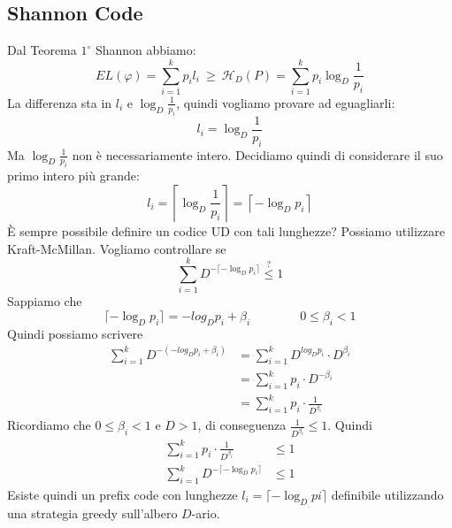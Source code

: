 \subsection{Shannon Code}
Dal Teorema $1^\circ$ Shannon abbiamo:
$$
EL(\varphi) = \sum_{i=1}^k p_il_i ~ \geq ~ \mathcal{H}_D(P) = \sum_{i=1}^k p_i\log_D\frac{1}{p_i}
$$
La differenza sta in $l_i$ e $\log_D\frac{1}{p_i}$, quindi vogliamo provare ad eguagliarli:
$$
    l_i = \log_D\frac{1}{p_i}
$$
Ma $\log_D\frac{1}{p_i}$ non è necessariamente intero. Decidiamo quindi di considerare il suo primo intero più grande:
$$
l_i = \left\lceil\log_D\frac{1}{p_i}\right\rceil = \left\lceil-\log_Dp_i\right\rceil
$$
È sempre possibile definire un codice UD con tali lunghezze? Possiamo utilizzare Kraft-McMillan. Vogliamo controllare se
$$
    \sum_{i=1}^k D^{-\lceil-\log_Dp_i\rceil}
    \stackrel{?}{\leq}
    1
$$
Sappiamo che 
$$
    \lceil-\log_Dp_i\rceil = -log_Dp_i+\beta_i \qquad\qquad 0\leq\beta_i<1
$$
Quindi possiamo scrivere
\begin{align*}
    \sum_{i=1}^k D^{-(-log_Dp_i+\beta_i)} &= \sum_{i=1}^k D^{log_Dp_i}\cdot D^{\beta_i}\\
    &= \sum_{i=1}^k p_i\cdot D^{-\beta_i}\\
    &= \sum_{i=1}^k p_i\cdot \frac{1}{D^{\beta_i}}
\end{align*}
Ricordiamo che $0\leq\beta_i<1$ e $D>1$, di conseguenza $\frac{1}{D^{\beta_i}}\leq 1$. Quindi
\begin{align*}
    \sum_{i=1}^k p_i\cdot \frac{1}{D^{\beta_i}} &\leq 1\\
    \sum_{i=1}^k D^{-\lceil-\log_Dp_i\rceil} &\leq 1
\end{align*}
Esiste quindi un prefix code con lunghezze $l_i=\lceil-\log_Dpi\rceil$ definibile utilizzando una strategia greedy sull'albero $D$-ario.
\begin{center}
\end{center}


